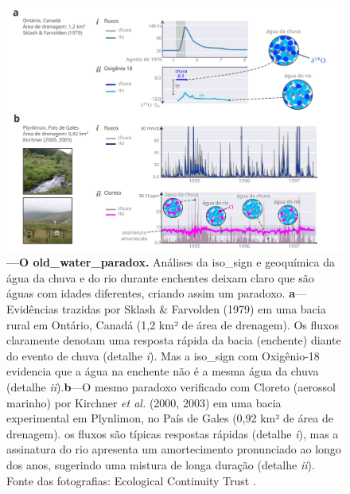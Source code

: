 \documentclass[./main.tex]{subfiles}
\begin{document}
\begin{figure}[t!] 
\centering				
\includegraphics[width=0.98\linewidth]{figs/fig_paradox2.jpg}		
\caption[O paradoxo da água velha]
{\textbf{---\;O \gls{old_water_paradox}.}
    Análises da \gls{iso_sign} e geoquímica da água da chuva e do rio durante enchentes deixam claro que são águas com idades diferentes, criando assim um paradoxo. \;\textbf{a}\;---\;Evidências trazidas por Sklash \& Farvolden (1979) \cite{sklash1979} em uma bacia rural em Ontário, Canadá (1,2 km² de área de drenagem). Os fluxos claramente denotam uma resposta rápida da bacia (enchente) diante do evento de chuva (detalhe \textrm{\textit{i}}). Mas a \gls{iso_sign} com Oxigênio-18 evidencia que a água na enchente não é a mesma água da chuva (detalhe \textrm{\textit{ii}}).\;\textbf{b}\;---\;O mesmo paradoxo verificado com Cloreto (aerossol marinho) por Kirchner \textit{et al.} (2000, 2003) \cite{kirchner2000, Kirchner2003} em uma bacia experimental em Plynlimon, no País de Gales (0,92 km² de área de drenagem). os fluxos são típicas respostas rápidas (detalhe \textrm{\textit{i}}), mas a assinatura do rio apresenta um amortecimento pronunciado ao longo dos anos, sugerindo uma mistura de longa duração (detalhe \textrm{\textit{ii}}). Fonte das fotografias: Ecological Continuity Trust \cite{ect_plynlimon}.
}
\label{fig:hydro:paradox2} 		
\end{figure}
\end{document}
